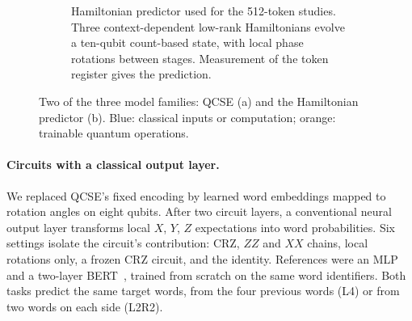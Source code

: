 \documentclass[11pt,a4paper]{article}
\providecommand{\ket}[1]{\lvert #1\rangle}
\begin{document}
\begin{figure}[!tb]
  \vspace{1.4em}
  \begin{subfigure}{\linewidth}
    \centering
    \caption{Hamiltonian predictor used for the 512-token studies. Three context-dependent low-rank Hamiltonians evolve a ten-qubit count-based state, with local phase rotations between stages. Measurement of the token register gives the prediction.}
  \end{subfigure}
  \caption{Two of the three model families: QCSE (a) and the Hamiltonian predictor (b). Blue: classical inputs or computation; orange: trainable quantum operations.}
  \label{fig:models}
\end{figure}

\paragraph{Circuits with a classical output layer.}
We replaced QCSE's fixed encoding by learned word embeddings mapped to rotation angles on eight qubits. After two circuit layers, a conventional neural output layer transforms local $X$, $Y$, $Z$ expectations into word probabilities. Six settings isolate the circuit's contribution: CRZ, $ZZ$ and $XX$ chains, local rotations only, a frozen CRZ circuit, and the identity. References were an MLP~\cite{bengio2003} and a two-layer BERT~\cite{devlin2019}, trained from scratch on the same word identifiers. Both tasks predict the same target words, from the four previous words (L4) or from two words on each side (L2R2).
\end{document}
